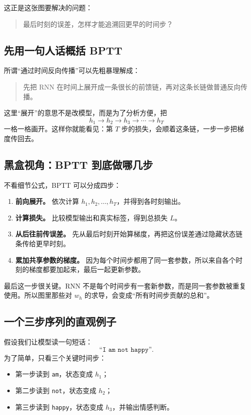\documentclass[12pt,a4paper]{ctexart}
\begin{document}
这正是这张图要解决的问题：
\begin{quote}
最后时刻的误差，怎样才能追溯回更早的时间步？
\end{quote}

\subsection{先用一句人话概括 BPTT}

所谓“通过时间反向传播”可以先粗暴理解成：
\begin{quote}
先把 RNN 在时间上展开成一条很长的前馈链，再对这条长链做普通反向传播。
\end{quote}

这里“展开”的意思不是改模型，而是为了分析方便，把
\[
h_1 \rightarrow h_2 \rightarrow h_3 \rightarrow \cdots \rightarrow h_T
\]
一格一格画开。这样你就能看见：第 \(T\) 步的损失，会顺着这条链，一步一步把梯度传回去。

\subsection{黑盒视角：BPTT 到底做哪几步}

不看细节公式，BPTT 可以分成四步：

\begin{enumerate}
  \item \textbf{前向展开。} 依次计算 \(h_1, h_2, \ldots, h_T\)，并得到各时刻输出。
  \item \textbf{计算损失。} 比较模型输出和真实标签，得到总损失 \(L\)。
  \item \textbf{从后往前传误差。} 先从最后时刻开始算梯度，再把这份误差通过隐藏状态链条传给更早时刻。
  \item \textbf{累加共享参数的梯度。} 因为每个时间步都用了同一套参数，所以来自各个时刻的梯度都要加起来，最后一起更新参数。
\end{enumerate}

最后这一步很关键。RNN 不是每个时间步有一套新参数，而是同一套参数被重复使用。所以图里那些对 \(w_h\) 的求导，会变成“所有时间步贡献的总和”。

\subsection{一个三步序列的直观例子}

假设我们让模型读一句短话：
\[
\texttt{``I am not happy''}.
\]
为了简单，只看三个关键时间步：
\begin{itemize}
  \item 第一步读到 \texttt{am}，状态变成 \(h_1\)；
  \item 第二步读到 \texttt{not}，状态变成 \(h_2\)；
  \item 第三步读到 \texttt{happy}，状态变成 \(h_3\)，并输出情感判断。
\end{itemize}
\end{document}
